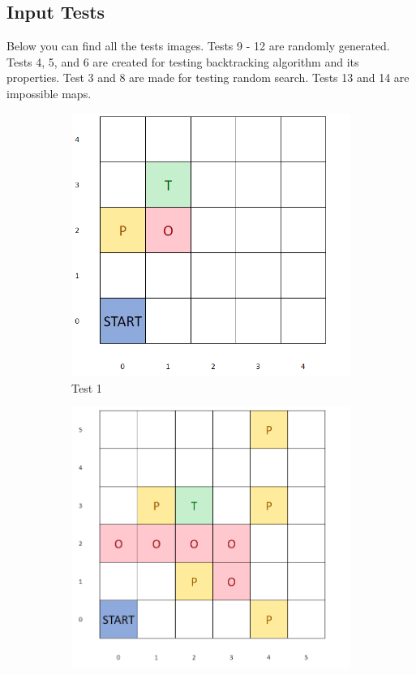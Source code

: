 \documentclass{article}
\begin{document}
\begin{appendices}
\section{Input Tests}
\label{appendix:tests}
Below you can find all the tests images. Tests 9 - 12 are randomly generated. Tests 4, 5, and 6 are created for testing backtracking algorithm and its properties. Test 3 and 8 are made for testing random search. Tests 13 and 14 are impossible maps.
\begin{figure}[H]
   	 \centering
     \begin{subfigure}[b]{0.45\textwidth}
         \centering
         \includegraphics[width=\textwidth]{images/image1.png}
         \caption{Test 1}
         \label{fig:test13}
     \end{subfigure}
     \hfill
     \begin{subfigure}[b]{0.45\textwidth}
         \centering
         \includegraphics[width=\textwidth]{images/image2.png}

\end{subfigure}
\end{figure}
\end{appendices}
\end{document}
